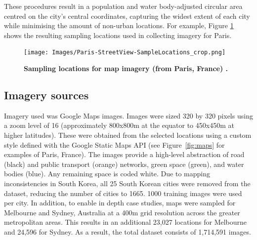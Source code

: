 \documentclass[final,3p,times,authoryear]{elsarticle}
\begin{document}
These procedures result in a population and water body-adjusted circular area centred on the city's central coordinates, capturing the widest extent of each city while minimising the amount of non-urban locations. For example, Figure \ref{fig:parissample} shows the resulting sampling locations used in collecting imagery for Paris. 

\begin{figure}[!htbp]
    \centering    
\texttt{[image: Images/Paris-StreetView-SampleLocations\_crop.png]}  
\caption{\bf Sampling locations for map imagery (from Paris, France) \citep{GoogleStatic2017}.}    
 \label{fig:parissample}  
\end{figure} 



\subsection{Imagery sources}\label{methodsimagery}
Imagery used was Google Maps images. Images were sized 320 by 320 pixels using a zoom level of 16 (approximately 800x800m at the equator to 450x450m at higher latitudes). These were obtained from the selected locations using a custom style defined with the Google Static Maps API \citep{GoogleStatic2017} (see Figure~\ref{fig:maps} for examples of Paris, France). The images provide a high-level abstraction of road (black) and public transport (orange) networks, green space (green), and water bodies (blue). Any remaining space is coded white. Due to mapping inconsistencies in South Korea, all 25 South Korean cities were removed from the dataset, reducing the number of cities to 1665. 1000 training images were used per city. In addition, to enable in depth case studies, maps were sampled for Melbourne and Sydney, Australia at a 400m grid resolution across the greater metropolitan areas. This results in an additional 23,027 locations for Melbourne and 24,596 for Sydney. As a result, the total dataset consists of 1,714,591 images.
\end{document}
